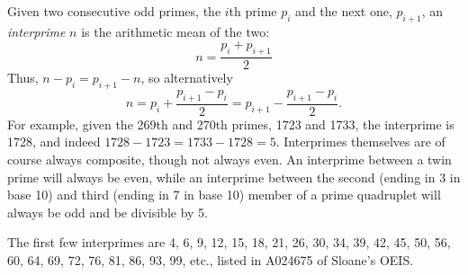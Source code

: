 \documentclass[12pt]{article}
\begin{document}
Given two consecutive odd primes, the $i$th prime $p_i$ and the next one, $p_{i + 1}$, an {\em interprime} $n$ is the arithmetic mean of the two: $$n = \frac{p_i + p_{i + 1}}{2}$$ Thus, $n - p_i = p_{i + 1} - n$, so alternatively $$n = p_i + \frac{p_{i + 1} - p_i}{2} = p_{i + 1} - \frac{p_{i + 1} - p_i}{2}.$$ For example, given the 269th and 270th primes, 1723 and 1733, the interprime is 1728, and indeed $1728 - 1723 = 1733 - 1728 = 5$. Interprimes themselves are of course always composite, though not always even. An interprime between a twin prime will always be even, while an interprime between the second (ending in 3 in base 10) and third (ending in 7 in base 10) member of a prime quadruplet will always be odd and be divisible by 5.

The first few interprimes are 4, 6, 9, 12, 15, 18, 21, 26, 30, 34, 39, 42, 45, 50, 56, 60, 64, 69, 72, 76, 81, 86, 93, 99, etc., listed in A024675 of Sloane's OEIS.
\end{document}
